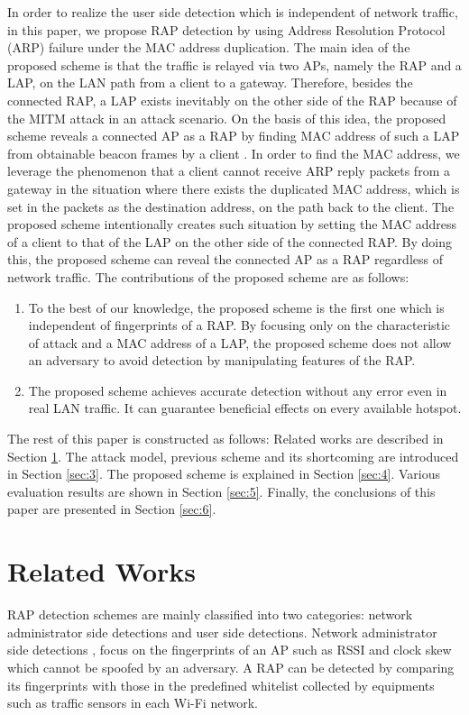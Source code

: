 \documentclass[paper]{ieice}
\begin{document}
In order to realize the user side detection which is independent of network traffic, in this paper, we propose RAP detection by using Address Resolution Protocol (ARP) failure under the MAC address duplication.
The main idea of the proposed scheme is that the traffic is relayed via two APs, namely the RAP and a LAP, on the LAN path from a client to a gateway.
Therefore, besides the connected RAP, a LAP exists inevitably on the other side of the RAP because of the MITM attack in an attack scenario.
On the basis of this idea, the proposed scheme reveals a connected AP as a RAP by finding MAC address of such a LAP from obtainable beacon frames by a client \cite{beacon}.
In order to find the MAC address, we leverage the phenomenon that a client cannot receive ARP reply packets from a gateway in the situation where there exists the duplicated MAC address, which is set in the packets as the destination address, on the path back to the client.
The proposed scheme intentionally creates such situation by setting the MAC address of a client to that of the LAP on the other side of the connected RAP.
By doing this, the proposed scheme can reveal the connected AP as a RAP regardless of network traffic.
The contributions of the proposed scheme are as follows:
\begin{enumerate}
    \renewcommand{\labelenumi}{\arabic{enumi}).}
    \item To the best of our knowledge, the proposed scheme is the first one which is independent of fingerprints of a RAP. By focusing only on the characteristic of attack and a MAC address of a LAP, the proposed scheme does not allow an adversary to avoid detection by manipulating features of the RAP.
    \item The proposed scheme achieves accurate detection without any error even in real LAN traffic. It can guarantee beneficial effects on every available hotspot.
\end{enumerate}
The rest of this paper is constructed as follows: Related works are described in Section \ref{sec:2}.
The attack model, previous scheme and its shortcoming are introduced in Section \ref{sec:3}.
The proposed scheme is explained in Section \ref{sec:4}.
Various evaluation results are shown in Section \ref{sec:5}.
Finally, the conclusions of this paper are presented in Section \ref{sec:6}.

\section{Related Works}\label{sec:2}
RAP detection schemes are mainly classified into two categories: network administrator side detections and user side detections.
Network administrator side detections \cite{prapd}, \cite{clockskew} focus on the fingerprints of an AP such as RSSI and clock skew which cannot be spoofed by an adversary.
A RAP can be detected by comparing its fingerprints with those in the predefined whitelist collected by equipments such as traffic sensors in each Wi-Fi network.
\end{document}
